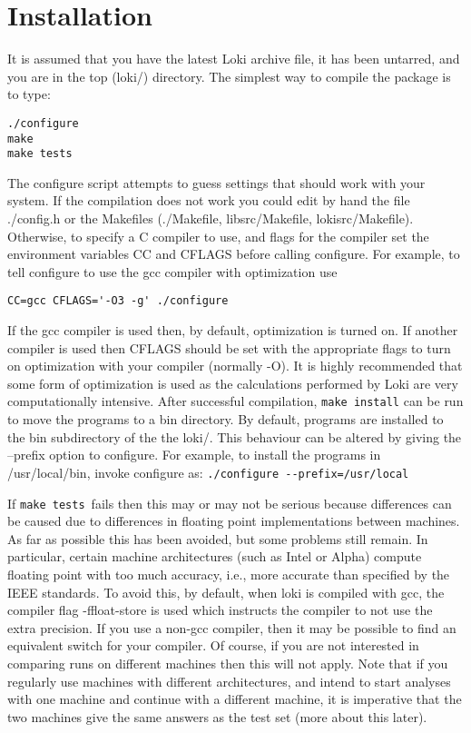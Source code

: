 \documentclass[10pt,a4paper]{article}
\begin{document}
\section{Installation}
It is assumed that you have the latest Loki archive file, it has been
untarred, and you are in the top (loki/) directory.  The simplest way to
compile the package is to type:
\begin{verbatim}  
./configure
make
make tests
\end{verbatim}
The configure script attempts to guess settings that should work with your
system.  If the compilation does not work you could edit by hand the file
./config.h or the Makefiles (./Makefile, libsrc/Makefile, lokisrc/Makefile).
Otherwise, to specify a C compiler to use, and flags for the compiler set
the environment variables CC and CFLAGS before calling configure.  For
example, to tell configure to use the gcc compiler with optimization use
\begin{verbatim}
CC=gcc CFLAGS='-O3 -g' ./configure
\end{verbatim}
If the gcc compiler is used then, by default, optimization is turned on.  If
another compiler is used then CFLAGS should be set with the appropriate
flags to turn on optimization with your compiler (normally -O). It is highly
recommended that some form of optimization is used as the calculations
performed by Loki are very computationally intensive. After successful
compilation, \verb+make install+ can be run to move the programs to a bin
directory.  By default, programs are installed to the bin subdirectory of
the the loki/.  This behaviour can be altered by giving the --prefix option
to configure.  For example, to install the programs in /usr/local/bin,
invoke configure as: \verb+./configure --prefix=/usr/local+

If \verb+make tests+\ fails then this may or may not be serious because
differences can be caused due to differences in floating point
implementations between machines.  As far as possible this has been avoided,
but some problems still remain.  In particular, certain machine
architectures (such as Intel or Alpha) compute floating point with too much
accuracy, i.e., more accurate than specified by the IEEE standards.  To
avoid this, by default, when loki is compiled with gcc, the compiler flag
-ffloat-store is used which instructs the compiler to not use the extra
precision.  If you use a non-gcc compiler, then it may be possible to find
an equivalent switch for your compiler.  Of course, if you are not
interested in comparing runs on different machines then this will not apply.
Note that if you regularly use machines with different architectures, and
intend to start analyses with one machine and continue with a different
machine, it is imperative that the two machines give the same answers as the
test set (more about this later).
\end{document}

